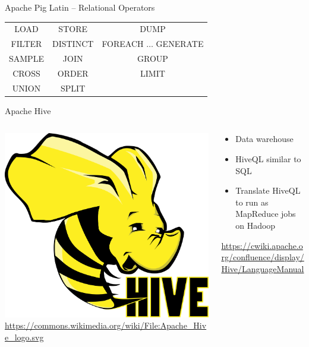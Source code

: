 \documentclass[ignorenonframetext,xcolor=x11names]{beamer}
\begin{document}
\begin{frame}{Apache Pig Latin -- Relational Operators}
\renewcommand{\arraystretch}{1.5}

\begin{tabular}{ccc} 
LOAD & STORE & DUMP \\
FILTER & DISTINCT & FOREACH $\ldots$ GENERATE \\
SAMPLE & JOIN & GROUP  \\
CROSS & ORDER & LIMIT  \\
UNION & SPLIT \\
\end{tabular}
\end{frame}

\begin{frame}{Apache Hive}
\begin{columns}
\begin{column}{.4\textwidth}
\centering
\includegraphics[width=.75\textwidth]{hive_logo.png} \\
\tiny\url{https://commons.wikimedia.org/wiki/File:Apache_Hive_logo.svg}
\end{column}
\begin{column}{.6\textwidth}
\begin{itemize}
   \item Data warehouse
   \item HiveQL similar to SQL
   \item Translate HiveQL to run as MapReduce jobs on Hadoop
\end{itemize}

\vspace{\baselineskip}
\url{https://cwiki.apache.org/confluence/display/Hive/LanguageManual}
\end{column}
\end{columns}
\end{frame}
\end{document}
